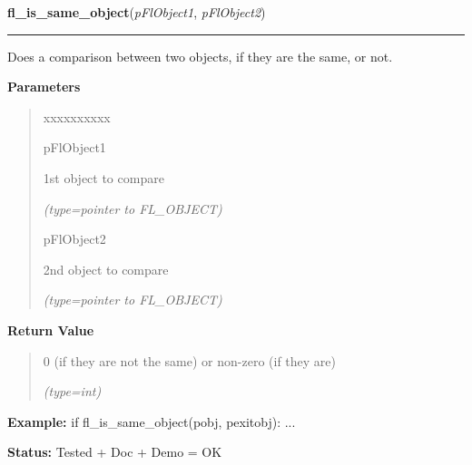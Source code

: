 \hspace{.8\funcindent}\begin{boxedminipage}{\funcwidth}

    \raggedright \textbf{fl\_is\_same\_object}(\textit{pFlObject1}, \textit{pFlObject2})

    \vspace{-1.5ex}

    \rule{\textwidth}{0.5\fboxrule}
\setlength{\parskip}{2ex}
    Does a comparison between two objects, if they are the same, or not.

\setlength{\parskip}{1ex}
      \textbf{Parameters}
      \vspace{-1ex}

      \begin{quote}
        \begin{Ventry}{xxxxxxxxxx}

          \item[pFlObject1]

          1st object to compare

            {\it (type=pointer to FL\_OBJECT)}

          \item[pFlObject2]

          2nd object to compare

            {\it (type=pointer to FL\_OBJECT)}

        \end{Ventry}

      \end{quote}

      \textbf{Return Value}
    \vspace{-1ex}

      \begin{quote}
      0 (if they are not the same) or non-zero (if they are)

      {\it (type=int)}

      \end{quote}

\textbf{Example:} if fl\_is\_same\_object(pobj, pexitobj): ...



\textbf{Status:} Tested + Doc + Demo = OK



    \end{boxedminipage}



